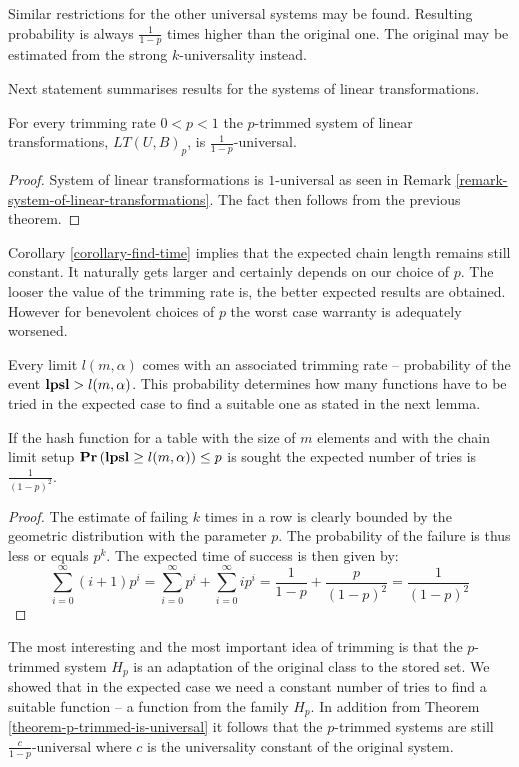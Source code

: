 Similar restrictions for the other universal systems may be found. Resulting probability is always $\frac{1}{1 - p}$ times higher than the original one. The original may be estimated from the strong $k$-universality instead.

Next statement summarises results for the systems of linear transformations.

\begin{corollary}
\label{corollary-trimming-linear}
For every trimming rate $0 < p < 1$ the $p$-trimmed system of linear transformations, $LT(U, B)_p$, is $\frac{1}{1 - p}$-universal.
\end{corollary}
\begin{proof}
System of linear transformations is $1$-universal as seen in Remark \ref{remark-system-of-linear-transformations}. The fact then follows from the previous theorem.
\end{proof}

Corollary \ref{corollary-find-time} implies that the expected chain length remains still constant. It naturally gets larger and certainly depends on our choice of $p$. The looser the value of the trimming rate is, the better expected results are obtained. However for benevolent choices of $p$ the worst case warranty is adequately worsened.

Every limit $l(m, \alpha)$ comes with an associated trimming rate -- probability of the event $\mathbf{lpsl} > l(m, \alpha)$. This probability determines how many functions have to be tried in the expected case to find a suitable one as stated in the next lemma.

\begin{lemma}
\label{lemma-linear-transformations-tries}
If the hash function for a table with the size of $m$ elements and with the chain limit setup $\mathbf{Pr}\left(\mathbf{lpsl} \geq l(m, \alpha)\right) \leq p$ is sought the expected number of tries is $\frac{1}{(1 - p)^2}$.
\end{lemma}
\begin{proof}
The estimate of failing $k$ times in a row is clearly bounded by the geometric distribution with  the parameter $p$. The probability of the failure is thus less or equals $p ^ k$. The expected time of success is then given by:
\[
\sum_{i = 0}^{\infty} (i + 1)p^i = \sum_{i = 0}^{\infty}p^i + \sum_{i = 0}^{\infty}ip^i = \frac{1}{1 - p} + \frac{p}{(1- p)^2} = \frac{1}{(1 - p)^2}
\]
\end{proof}

The most interesting and the most important idea of trimming is that the $p$-trimmed system $H_p$ is an adaptation of the original class to the stored set. We showed that in the expected case we need a constant number of tries to find a suitable function -- a function from the family $H_p$. In addition from Theorem \ref{theorem-p-trimmed-is-universal} it follows that the $p$-trimmed systems are still $\frac{c}{1 - p}$-universal where $c$ is the universality constant of the original system.

